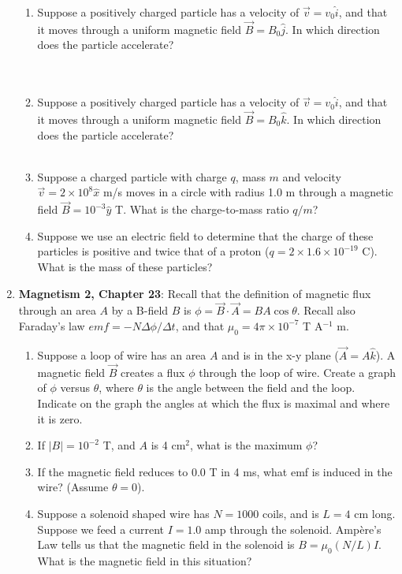 \documentclass[10pt]{article}
\begin{document}
\begin{enumerate}
\begin{enumerate}
\item Suppose a positively charged particle has a velocity of $\vec{v} = v_0 \hat{i}$, and that it moves through a uniform magnetic field $\vec{B} = B_0 \hat{j}$.  In which direction does the particle accelerate? \\ \\ \\
\item Suppose a positively charged particle has a velocity of $\vec{v} = v_0 \hat{i}$, and that it moves through a uniform magnetic field $\vec{B} = B_0 \hat{k}$.  In which direction does the particle accelerate? \\ \\
\item Suppose a charged particle with charge $q$, mass $m$ and velocity $\vec{v} = 2 \times 10^{8} \hat{x}$ m/s moves in a circle with radius 1.0 m through a magnetic field $\vec{B} = 10^{-3} \hat{y}$ T.  What is the charge-to-mass ratio $q/m$? \\ \vspace{3cm}
\item Suppose we use an electric field to determine that the charge of these particles is positive and twice that of a proton ($q = 2 \times 1.6 \times 10^{-19}$ C).  What is the mass of these particles? \\ \vspace{3cm}
\end{enumerate}
\item \textbf{Magnetism 2, Chapter 23}:  Recall that the definition of magnetic flux through an area $A$ by a B-field $B$ is $\phi = \vec{B} \cdot \vec{A} = BA\cos\theta$.  Recall also Faraday's law $emf = -N \Delta \phi/\Delta t$, and that $\mu_0 = 4\pi \times 10^{-7}$ T A$^{-1}$ m.
\begin{enumerate}
\item Suppose a loop of wire has an area $A$ and is in the x-y plane ($\vec{A} = A \hat{k}$).  A magnetic field $\vec{B}$ creates a flux $\phi$ through the loop of wire.  Create a graph of $\phi$ versus $\theta$, where $\theta$ is the angle between the field and the loop.   Indicate on the graph the angles at which the flux is maximal and where it is zero.\\ \vspace{3cm}
\item If $|B| = 10^{-2}$ T, and $A$ is 4 cm$^2$, what is the maximum $\phi$? \\ \vspace{3cm}
\item If the magnetic field reduces to 0.0 T in 4 ms, what emf is induced in the wire? (Assume $\theta = 0$). \\ \vspace{3cm}
\item Suppose a solenoid shaped wire has $N=1000$ coils, and is $L = 4$ cm long.  Suppose we feed a current $I = 1.0$ amp through the solenoid.  Amp\`{e}re's Law tells us that the magnetic field in the solenoid is $B = \mu_0 (N/L) I$.  What is the magnetic field in this situation?
\end{enumerate}
\end{enumerate}
\end{document}
